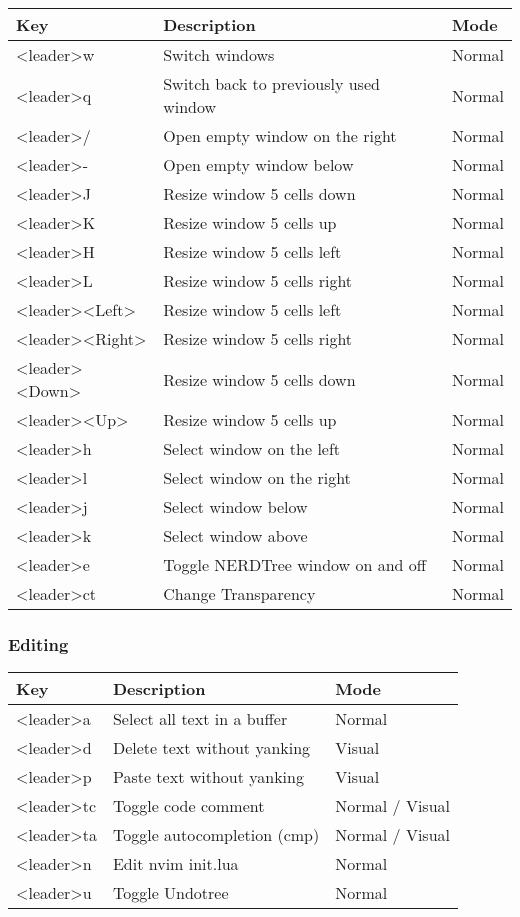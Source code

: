 \documentclass{article}
\newcommand{\tl}{\textless}
\newcommand{\tg}{\textgreater}
\begin{document}
\begin{tabular}{|l|l|l|}
\hline
Key & Description & Mode \\
\hline
\tl leader\tg w & Switch windows & Normal \\
\tl leader\tg q & Switch back to previously used window & Normal \\
\tl leader\tg / & Open empty window on the right & Normal \\
\tl leader\tg - & Open empty window below & Normal \\
\tl leader\tg J & Resize window 5 cells down & Normal \\
\tl leader\tg K & Resize window 5 cells up & Normal \\
\tl leader\tg H & Resize window 5 cells left & Normal \\
\tl leader\tg L & Resize window 5 cells right & Normal \\
\tl leader\tg \tl Left\tg & Resize window 5 cells left & Normal \\
\tl leader\tg \tl Right\tg & Resize window 5 cells right & Normal \\
\tl leader\tg \tl Down\tg & Resize window 5 cells down & Normal \\
\tl leader\tg \tl Up\tg & Resize window 5 cells up & Normal \\
\tl leader\tg h & Select window on the left & Normal \\
\tl leader\tg l & Select window on the right & Normal \\
\tl leader\tg j & Select window below & Normal \\
\tl leader\tg k & Select window above & Normal \\
\tl leader\tg e & Toggle NERDTree window on and off & Normal \\
\tl leader\tg ct & Change Transparency & Normal \\
\hline
\end{tabular}

\subsubsection{Editing}

\begin{tabular}{|l|l|l|}
\hline
Key & Description & Mode \\
\hline
\tl leader\tg a & Select all text in a buffer & Normal \\
\tl leader\tg d & Delete text without yanking & Visual \\
\tl leader\tg p & Paste text without yanking & Visual \\
\tl leader\tg tc & Toggle code comment & Normal / Visual \\
\tl leader\tg ta & Toggle autocompletion (cmp) & Normal / Visual \\
\tl leader\tg n & Edit nvim init.lua & Normal \\
\tl leader\tg u & Toggle Undotree & Normal \\
\hline
\end{tabular}
\end{document}
